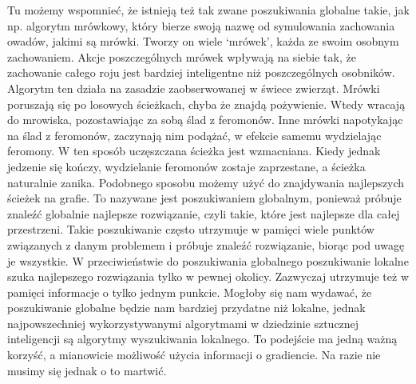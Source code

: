 Tu możemy wspomnieć, że istnieją też tak zwane poszukiwania globalne takie, jak np. algorytm mrówkowy, który bierze swoją nazwę od symulowania zachowania owadów, jakimi są mrówki. Tworzy on wiele ‘mrówek’, każda ze swoim osobnym zachowaniem. Akcje poszczególnych mrówek wpływają na siebie tak, że zachowanie całego roju jest bardziej inteligentne niż poszczególnych osobników. Algorytm ten działa na zasadzie zaobserwowanej w świece zwierząt. Mrówki poruszają się po losowych ścieżkach, chyba że znajdą pożywienie. Wtedy wracają do mrowiska, pozostawiając za sobą ślad z feromonów. Inne mrówki napotykając na ślad z feromonów, zaczynają nim podążać, w efekcie samemu wydzielając feromony. W ten sposób uczęszczana ścieżka jest wzmacniana. Kiedy jednak jedzenie się kończy, wydzielanie feromonów zostaje zaprzestane, a ścieżka naturalnie zanika. Podobnego sposobu możemy użyć do znajdywania najlepszych ścieżek na grafie. To nazywane jest poszukiwaniem globalnym, ponieważ próbuje znaleźć globalnie najlepsze rozwiązanie, czyli takie, które jest najlepsze dla całej przestrzeni. Takie poszukiwanie często utrzymuje w pamięci wiele punktów związanych z danym problemem i próbuje znaleźć rozwiązanie, biorąc pod uwagę je wszystkie. W przeciwieństwie do poszukiwania globalnego poszukiwanie lokalne szuka najlepszego rozwiązania tylko w pewnej okolicy. Zazwyczaj utrzymuje też w pamięci informacje o tylko jednym punkcie. Mogłoby się nam wydawać, że poszukiwanie globalne będzie nam bardziej przydatne niż lokalne, jednak najpowszechniej wykorzystywanymi algorytmami w dziedzinie sztucznej inteligencji są algorytmy wyszukiwania lokalnego. To podejście ma jedną ważną korzyść, a mianowicie możliwość użycia informacji o gradiencie. Na razie nie musimy się jednak o to martwić.\newline

